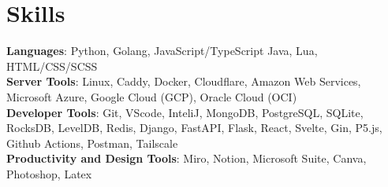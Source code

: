 \documentclass[letterpaper,11pt]{article}
\begin{document}
\section{Skills}
\small{

\textbf{Languages}{: Python, Golang, JavaScript/TypeScript Java, Lua, HTML/CSS/SCSS} \\
\textbf{Server Tools}{: Linux, Caddy, Docker, Cloudflare, Amazon Web Services, Microsoft Azure, Google Cloud (GCP), Oracle Cloud (OCI)} \\
\textbf{Developer Tools}{: Git, VScode, InteliJ, MongoDB, PostgreSQL, SQLite, RocksDB, LevelDB, Redis, Django, FastAPI, Flask, React, Svelte, Gin, P5.js, Github Actions, Postman, Tailscale} \\
\textbf{Productivity and Design Tools}{: Miro, Notion, Microsoft Suite, Canva, Photoshop, Latex} \\
}
\end{document}
